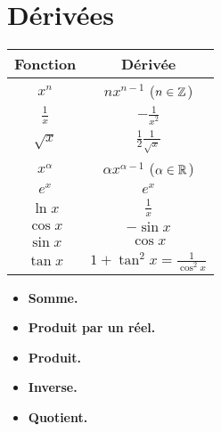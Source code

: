 \documentclass[10pt,class=article,crop=false]{standalone}
\begin{document}
\section{Dérivées}


\begin{multicols}{2}

\begin{center}
	\setlength{\arrayrulewidth}{0.05mm}
	\begin{tabular}[t]{|c|c@{\vrule depth 1.2ex height 3ex width 0mm \ }|}
		\hline
		\textbf{Fonction}         & \textbf{Dérivée} \\ \hline
		$x^n$         & $nx^{n-1}$  \quad ($n \in \mathbb{Z}$)   \\ \hline
		$\frac 1x$    & $-\frac{1}{x^2}$              \\ \hline
		$\sqrt{x}$    & $\frac12 \frac1{\sqrt{x}}$   \\ \hline
		$x^\alpha$   & $\alpha x^{\alpha-1}$  \quad ($\alpha\in\mathbb{R}$)  \\ \hline
		$e^x$         & $e^x$                        \\ \hline
		$\ln x$       & $\frac 1x$                   \\ \hline
		$\cos x$      & $-\sin x$                    \\ \hline
		$\sin x$      & $\cos x$                     \\ \hline
		$\tan x$      & $1+\tan^2 x = \frac{1}{\cos^2 x}$        \\ \hline
	\end{tabular}
\end{center}

\begin{itemize}
	\item \textbf{Somme.} 
	
	\item \textbf{Produit par un réel.}  
	
	\item \textbf{Produit.} 
	
	\item \textbf{Inverse.} 
	
	\item \textbf{Quotient.} 
\end{itemize}


\end{multicols}
\end{document}
